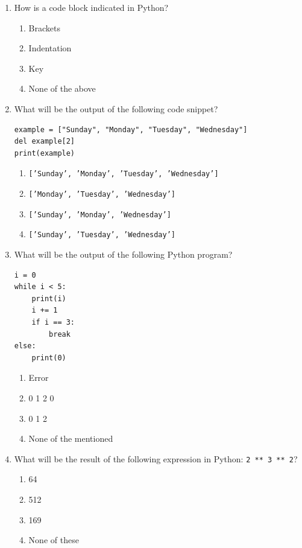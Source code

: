 \documentclass[11pt,a4paper]{article}
\begin{document}
\begin{enumerate}[label=(\roman*),leftmargin=*,itemsep=8pt]
  \item How is a code block indicated in Python?
  
\begin{enumerate}[label=(\alph*),itemsep=2pt]
    \item Brackets
    \item Indentation
    \item Key
    \item None of the above
  \end{enumerate}

  \item What will be the output of the following code snippet?
  
\begin{lstlisting}
example = ["Sunday", "Monday", "Tuesday", "Wednesday"]
del example[2]
print(example)
  \end{lstlisting}
  
\begin{enumerate}[label=(\alph*),itemsep=2pt]
    \item   \texttt{['Sunday', 'Monday', 'Tuesday', 'Wednesday']}
    \item   \texttt{['Monday', 'Tuesday', 'Wednesday']}
    \item   \texttt{['Sunday', 'Monday', 'Wednesday']}
    \item   \texttt{['Sunday', 'Tuesday', 'Wednesday']}
  \end{enumerate}

  \item What will be the output of the following Python program?
  
\begin{lstlisting}
i = 0
while i < 5:
    print(i)
    i += 1
    if i == 3:
        break
else:
    print(0)
  \end{lstlisting}
  
\begin{enumerate}[label=(\alph*),itemsep=2pt]
    \item Error
    \item 0 1 2 0
    \item 0 1 2
    \item None of the mentioned
  \end{enumerate}

  \item What will be the result of the following expression in Python:   \texttt{2 ** 3 ** 2}?
  
\begin{enumerate}[label=(\alph*),itemsep=2pt]
    \item 64
    \item 512
    \item 169
    \item None of these
  \end{enumerate}


\end{enumerate}
\end{document}
